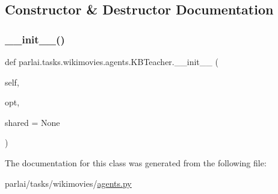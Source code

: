 \subsection{Constructor \& Destructor Documentation}
\mbox{\label{classparlai_1_1tasks_1_1wikimovies_1_1agents_1_1KBTeacher_af07082cfcac7b822a87ed83493dae616}} 
\subsubsection{\texorpdfstring{\+\_\+\+\_\+init\+\_\+\+\_\+()}{\_\_init\_\_()}}
{\footnotesize\ttfamily def parlai.\+tasks.\+wikimovies.\+agents.\+K\+B\+Teacher.\+\_\+\+\_\+init\+\_\+\+\_\+ (\begin{DoxyParamCaption}\item[{}]{self,  }\item[{}]{opt,  }\item[{}]{shared = {\ttfamily None} }\end{DoxyParamCaption})}



The documentation for this class was generated from the following file\+:\begin{DoxyCompactItemize}
\item 
parlai/tasks/wikimovies/\hyperlink{parlai_2tasks_2wikimovies_2agents_8py}{agents.\+py}\end{DoxyCompactItemize}
